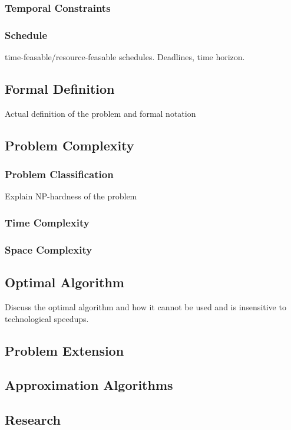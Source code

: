 \documentclass{article}
\begin{document}
\subsubsection{Temporal Constraints}
\subsubsection{Schedule}
time-feasable/resource-feasable schedules. Deadlines, time horizon.

\subsection{Formal Definition}
Actual definition of the problem and formal notation

\subsection{Problem Complexity}
\subsubsection{Problem Classification}
Explain NP-hardness of the problem
\subsubsection{Time Complexity}
\subsubsection{Space Complexity}

\subsection{Optimal Algorithm}
Discuss the optimal algorithm and how it cannot be used and is insensitive to technological speedups.

\subsection{Problem Extension}

\subsection{Approximation Algorithms}


\subsection{Research}
\end{document}
